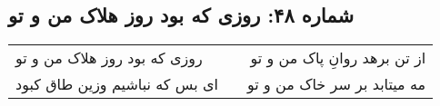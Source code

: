 \begin{center}
\section*{شماره ۴۸: روزی که بود روز هلاک من و تو}
\label{sec:048}
\begin{longtable}{l p{0.5cm} r}
روزی که بود روز هلاک من و تو
&&
از تن برهد روانِ پاک من و تو
\\
ای بس که نباشیم وزین طاق کبود
&&
مه میتابد بر سر خاک من و تو
\\
\end{longtable}
\end{center}
